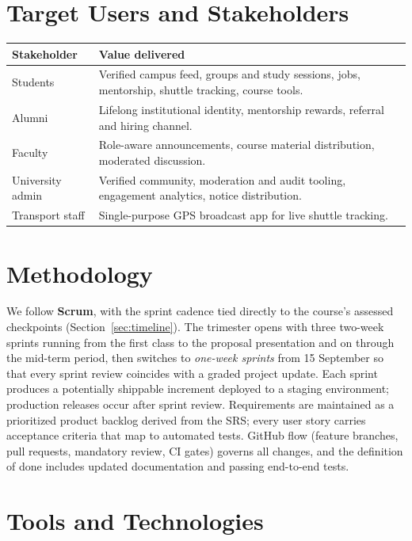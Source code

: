 \documentclass[11pt, a4paper]{article}
\begin{document}
\section{Target Users and Stakeholders}

\begin{center}
\begin{tabular}{p{3.2cm}p{10.5cm}}
    \toprule
    \textbf{Stakeholder} & \textbf{Value delivered} \\
    \midrule
    Students & Verified campus feed, groups and study sessions, jobs,
    mentorship, shuttle tracking, course tools. \\
    Alumni & Lifelong institutional identity, mentorship rewards, referral
    and hiring channel. \\
    Faculty & Role-aware announcements, course material distribution,
    moderated discussion. \\
    University admin & Verified community, moderation and audit tooling,
    engagement analytics, notice distribution. \\
    Transport staff & Single-purpose GPS broadcast app for live shuttle
    tracking. \\
    \bottomrule
\end{tabular}
\end{center}

\section{Methodology}

We follow \textbf{Scrum}, with the sprint cadence tied directly to the
course's assessed checkpoints (Section~\ref{sec:timeline}). The trimester
opens with three two-week sprints running from the first class to the
proposal presentation and on through the mid-term period, then switches to
\emph{one-week sprints} from 15 September so that every sprint review
coincides with a graded project update. Each sprint produces a potentially
shippable increment deployed to a staging environment; production releases
occur after sprint review. Requirements are
maintained as a prioritized product backlog derived from the SRS; every user
story carries acceptance criteria that map to automated tests. GitHub flow
(feature branches, pull requests, mandatory review, CI gates) governs all
changes, and the definition of done includes updated documentation and
passing end-to-end tests.

\section{Tools and Technologies}
\end{document}
